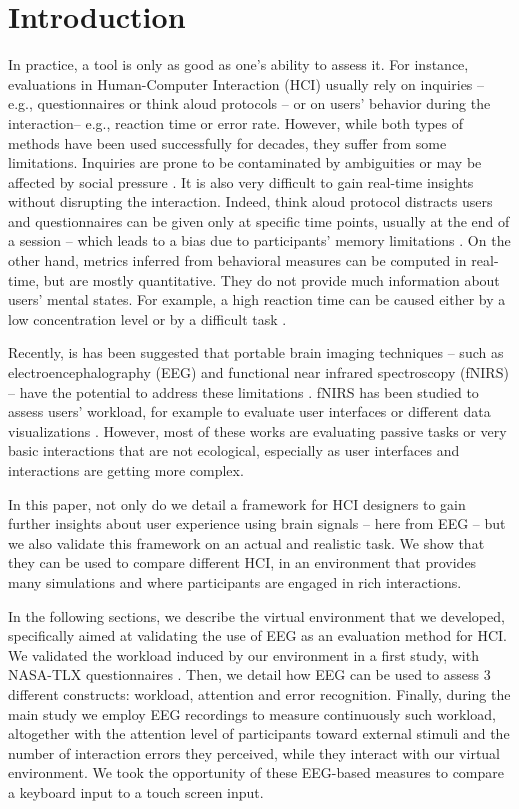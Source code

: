 \documentclass[]{sigchi}
\begin{document}
\section{Introduction}\label{introduction}

In practice, a tool is only as good as one's ability to assess it. For
instance, evaluations in Human-Computer Interaction (HCI) usually rely
on inquiries -- e.g., questionnaires or think aloud protocols -- or on
users' behavior during the interaction-- e.g., reaction time or error
rate. However, while both types of methods have been used successfully
for decades, they suffer from some limitations. Inquiries are prone to
be contaminated by ambiguities \citep{Nisbett1977} or may be affected by
social pressure \citep{Picard1995}. It is also very difficult to gain
real-time insights without disrupting the interaction. Indeed, think
aloud protocol distracts users and questionnaires can be given only at
specific time points, usually at the end of a session -- which leads to
a bias due to participants' memory limitations \citep{Kivikangas2010}.
On the other hand, metrics inferred from behavioral measures can be
computed in real-time, but are mostly quantitative. They do not provide
much information about users' mental states. For example, a high
reaction time can be caused either by a low concentration level or by a
difficult task \citep{Berka2007, Hart1988}.

Recently, is has been suggested that portable brain imaging techniques
-- such as electroencephalography (EEG) and functional near infrared
spectroscopy (fNIRS) -- have the potential to address these limitations
\citep{Fairclough2009a, Pikea2012, Frey2014a}. fNIRS has been studied to
assess users' workload, for example to evaluate user interfaces
\citep{Hirshfield2009a} or different data visualizations
\citep{Peck2013}. However, most of these works are evaluating passive
tasks or very basic interactions that are not ecological, especially as
user interfaces and interactions are getting more complex.

In this paper, not only do we detail a framework for HCI designers to
gain further insights about user experience using brain signals -- here
from EEG -- but we also validate this framework on an actual and
realistic task. We show that they can be used to compare different HCI,
in an environment that provides many simulations and where participants
are engaged in rich interactions.

In the following sections, we describe the virtual environment that we
developed, specifically aimed at validating the use of EEG as an
evaluation method for HCI. We validated the workload induced by our
environment in a first study, with NASA-TLX questionnaires
\citep{Hart1988}. Then, we detail how EEG can be used to assess 3
different constructs: workload, attention and error recognition.
Finally, during the main study we employ EEG recordings to measure
continuously such workload, altogether with the attention level of
participants toward external stimuli and the number of interaction
errors they perceived, while they interact with our virtual environment.
We took the opportunity of these EEG-based measures to compare a
keyboard input to a touch screen input.
\end{document}
